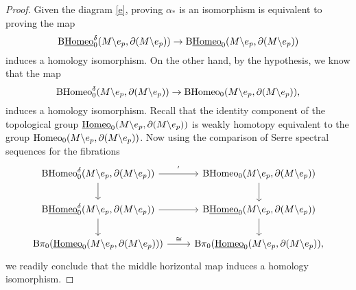 \documentclass[a4paper]{amsart}
\theoremstyle{definition}
\theoremstyle{remark}
\newcommand{\hcoker}{/\!\!/}
\newcommand{\tH}{\text{\textnormal{Homeo}}}
\newcommand{\BH}{\mathrm{B}\text{\textnormal{Homeo}}}
\newcommand{\BwH}{\mathrm{B}\underline{\text{\textnormal{Homeo}}}}
\newcommand{\BdH}{\mathrm{B}\text{\textnormal{Homeo}}^{\delta}}
\newcommand{\BdwH}{\mathrm{B}\underline{\text{\textnormal{Homeo}}}^{\delta}}
\numberwithin{equation}{section}
\begin{document}
\begin{proof}
Given the diagram \ref{e}, proving $\alpha_*$ is an isomorphism is equivalent to proving the map
\[
\BdwH_0(M\backslash e_p,\partial(M\backslash e_p))\to \BwH_0(M\backslash e_p,\partial(M\backslash e_p))
\]
induces a homology isomorphism. On the other hand, by the hypothesis, we know that the map 
\[
 \BdH_0(M\backslash e_p,\partial(M\backslash e_p))\to  \BH_0(M\backslash e_p,\partial(M\backslash e_p)),
\]
induces a homology isomorphism. Recall that the identity component of the topological group $\underline{\tH}_0(M\backslash e_p,\partial(M\backslash e_p))$ is weakly homotopy equivalent to the group $\tH_0(M\backslash e_p,\partial(M\backslash e_p))$. Now using the comparison of Serre spectral sequences for the fibrations
 \[
 \begin{tikzcd}
 \BdH_0(M\backslash e_p,\partial(M\backslash e_p))\arrow["'"]{r}\arrow[rightarrow]{d}& \BH_0(M\backslash e_p,\partial(M\backslash e_p))\arrow[rightarrow]{d}\\\BdwH_{0}(M\backslash e_p,\partial(M\backslash e_p))\arrow[""]{r}\arrow{d}& \BwH_{0}(M\backslash e_p,\partial(M\backslash e_p))\arrow{d}\\ \mathrm{B}\pi_0(\underline{\tH}_{0}(M\backslash e_p,\partial(M\backslash e_p)))\arrow["\cong"]{r}& \mathrm{B}\pi_0(\underline{\tH}_{0}(M\backslash e_p,\partial(M\backslash e_p)),
\end{tikzcd}
 \]
 we readily conclude that the middle horizontal map induces a homology isomorphism. 
\end{proof} 
\end{document}
